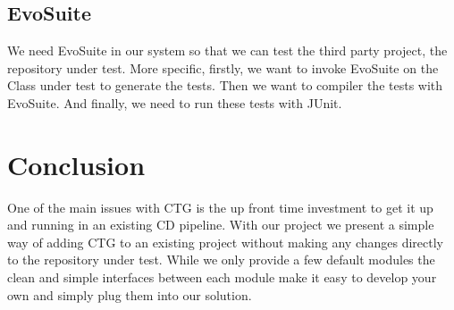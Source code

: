 \documentclass[12pt, a4paper]{article}
\begin{document}
\subsection{EvoSuite}
We need EvoSuite in our system so that we can test the third party project, the repository under test. More specific, firstly, we want to invoke EvoSuite on the Class under test to generate the tests. Then we want to compiler the tests with EvoSuite. And finally, we need to run these tests with JUnit. 

\section{Conclusion}
One of the main issues with CTG is the up front time investment to get it up and running in an existing CD pipeline. With our project we present a simple way of adding CTG to an existing project without making any changes directly to the repository under test. While we only provide a few default modules the clean and simple interfaces between each module make it easy to develop your own and simply plug them into our solution.



\newpage
{} %
\printbibliography %



\end{document}

